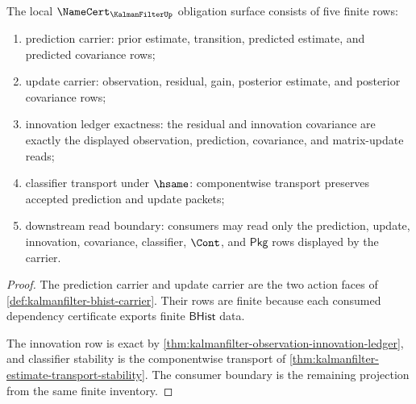 \begin{theorem}
\label{thm:kalman-filter-namecert-obligations}
\label{thm:kalmanfilter-namecert-obligation-surface}
The local $\NameCert_{\KalmanFilterUp}$ obligation surface consists of five finite rows:
\begin{enumerate}
\item prediction carrier: prior estimate, transition, predicted estimate, and predicted covariance rows;
\item update carrier: observation, residual, gain, posterior estimate, and posterior covariance rows;
\item innovation ledger exactness: the residual and innovation covariance are exactly the displayed observation, prediction, covariance, and matrix-update reads;
\item classifier transport under $\hsame$: componentwise transport preserves accepted prediction and update packets;
\item downstream read boundary: consumers may read only the prediction, update, innovation, covariance, classifier, $\Cont$, and $\mathsf{Pkg}$ rows displayed by the carrier.
\end{enumerate}
\end{theorem}
\begin{proof}
The prediction carrier and update carrier are the two action faces of \autoref{def:kalmanfilter-bhist-carrier}. Their rows are finite because each consumed dependency certificate exports finite $\mathsf{BHist}$ data.

The innovation row is exact by \autoref{thm:kalmanfilter-observation-innovation-ledger}, and classifier stability is the componentwise transport of \autoref{thm:kalmanfilter-estimate-transport-stability}. The consumer boundary is the remaining projection from the same finite inventory.
\end{proof}

